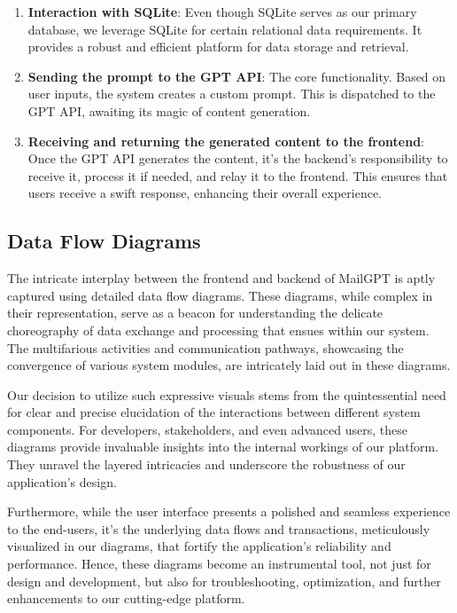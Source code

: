\documentclass[12pt]{article}
\begin{document}
\begin{enumerate}
	\item \textbf{Interaction with SQLite}: Even though SQLite serves as our primary database, we leverage SQLite for certain relational data requirements. It provides a robust and efficient platform for data storage and retrieval.
	      	          
	\item \textbf{Sending the prompt to the GPT API}: The core functionality. Based on user inputs, the system creates a custom prompt. This is dispatched to the GPT API, awaiting its magic of content generation.
	      	          
	\item \textbf{Receiving and returning the generated content to the frontend}: Once the GPT API generates the content, it's the backend's responsibility to receive it, process it if needed, and relay it to the frontend. This ensures that users receive a swift response, enhancing their overall experience.
\end{enumerate}

\subsection{Data Flow Diagrams}

The intricate interplay between the frontend and backend of MailGPT is aptly captured using detailed data flow diagrams. These diagrams, while complex in their representation, serve as a beacon for understanding the delicate choreography of data exchange and processing that ensues within our system. The multifarious activities and communication pathways, showcasing the convergence of various system modules, are intricately laid out in these diagrams. 

Our decision to utilize such expressive visuals stems from the quintessential need for clear and precise elucidation of the interactions between different system components. For developers, stakeholders, and even advanced users, these diagrams provide invaluable insights into the internal workings of our platform. They unravel the layered intricacies and underscore the robustness of our application’s design.

Furthermore, while the user interface presents a polished and seamless experience to the end-users, it's the underlying data flows and transactions, meticulously visualized in our diagrams, that fortify the application's reliability and performance. Hence, these diagrams become an instrumental tool, not just for design and development, but also for troubleshooting, optimization, and further enhancements to our cutting-edge platform.
\end{document}
